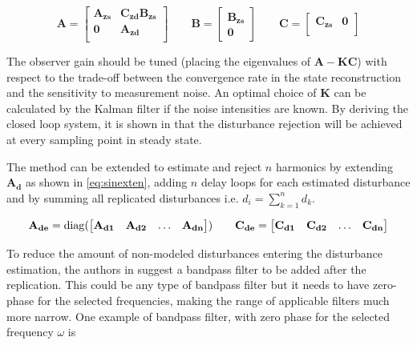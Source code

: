\begin{equation}
  \label{eq:augumented}
  \mathbf{A} =
    \begin{bmatrix}
       \mathbf{A_{zs}} & \mathbf{C_{zd}B_{zs}}\\[0.3em]
       \mathbf{0} & \mathbf{A_{zd}}\\
     \end{bmatrix}
     \qquad
  \mathbf{B} =
    \begin{bmatrix}
        \mathbf{B_{zs}}\\
        \mathbf{0}
    \end{bmatrix}
     \qquad
  \mathbf{C} =
    \begin{bmatrix}
        \mathbf{C_{zs}} & \mathbf{0}\\
    \end{bmatrix}
\end{equation}

The observer gain should be tuned (placing the eigenvalues of $\mathbf{A-KC}$) with respect to the trade-off between the convergence rate in the state reconstruction and the sensitivity to measurement noise. An optimal choice of  $\mathbf{K}$ can be calculated by the Kalman filter if the noise intensities are known. By deriving the closed loop system, it is shown in \citep{fujimoto2004repetitive} that the disturbance rejection will be achieved at every sampling point in steady state.

The method can be extended to estimate and reject $n$ harmonics by extending $\mathbf{A_d}$ as shown in \eqref{eq:sinexten}, adding $n$ delay loops for each estimated disturbance and by summing all replicated disturbances i.e. $d_i = \sum_{k=1}^{n} d_k$.

\begin{equation}
  \label{eq:sinexten}
  \mathbf{A_{de}} =
    \operatorname{diag}(\begin{bmatrix}
      \mathbf{A_{d1}}  &  \mathbf{A_{d2}} & \hdots & \mathbf{A_{dn}} \\
     \end{bmatrix})
     \qquad
  \mathbf{C_{de}} =
    \begin{bmatrix}
       \mathbf{C_{d1}}  &  \mathbf{C_{d2}} & \hdots & \mathbf{C_{dn}} \\
    \end{bmatrix}
\end{equation}

To reduce the amount of non-modeled disturbances entering the disturbance estimation, the authors in \citep{fujimoto2004repetitive} suggest a bandpass filter to be added after the replication. This could be any type of bandpass filter but it needs to have zero-phase for the selected frequencies, making the range of applicable filters much more narrow. One example of bandpass filter, with zero phase for the selected frequency $\omega$ is

